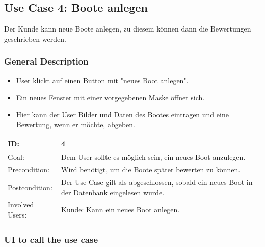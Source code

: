 \documentclass[12pt]{article}
\theoremstyle{definition}
\begin{document}
\subsection{Use Case 4: Boote anlegen}
Der Kunde kann neue Boote anlegen, zu diesem können dann die Bewertungen geschrieben werden.
\subsubsection{General Description}
	\begin{itemize}
		\item User klickt auf einen Button mit "neues Boot anlegen".
		\item Ein neues Fenster mit einer vorgegebenen Maske öffnet sich.
		\item Hier kann der User Bilder und Daten des Bootes eintragen und eine Bewertung, wenn er möchte, abgeben.
	\end{itemize}

\begin{tabular}{|p{.2\linewidth}|p{.65\linewidth}|}
\hline 
ID: & 4 \\ \hline
Goal: & Dem User sollte es möglich sein, ein neues Boot anzulegen. \\ \hline
Precondition: & Wird benötigt, um die Boote später bewerten zu können. \\ \hline
Postcondition: & Der Use-Case gilt als abgeschlossen, sobald ein neues Boot in der Datenbank eingelesen wurde.\\ \hline
Involved Users: &Kunde: Kann ein neues Boot anlegen. \\ \hline
\end{tabular}

\subsubsection{UI to call the use case}
\end{document}
